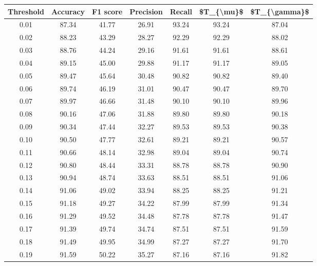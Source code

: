 \begin{tabular}{|c|c|c|c|c|c|c|}
\hline
 Threshold &  Accuracy &  F1 score &  Precision &  Recall &  \$T\_\{\textbackslash mu\}\$ &  \$T\_\{\textbackslash gamma\}\$ \\
\hline
      0.01 &     87.34 &     41.77 &      26.91 &   93.24 &      93.24 &         87.04 \\
      0.02 &     88.23 &     43.29 &      28.27 &   92.29 &      92.29 &         88.02 \\
      0.03 &     88.76 &     44.24 &      29.16 &   91.61 &      91.61 &         88.61 \\
      0.04 &     89.15 &     45.00 &      29.88 &   91.17 &      91.17 &         89.05 \\
      0.05 &     89.47 &     45.64 &      30.48 &   90.82 &      90.82 &         89.40 \\
      0.06 &     89.74 &     46.19 &      31.01 &   90.47 &      90.47 &         89.70 \\
      0.07 &     89.97 &     46.66 &      31.48 &   90.10 &      90.10 &         89.96 \\
      0.08 &     90.16 &     47.06 &      31.88 &   89.80 &      89.80 &         90.18 \\
      0.09 &     90.34 &     47.44 &      32.27 &   89.53 &      89.53 &         90.38 \\
      0.10 &     90.50 &     47.77 &      32.61 &   89.21 &      89.21 &         90.57 \\
      0.11 &     90.66 &     48.14 &      32.98 &   89.04 &      89.04 &         90.74 \\
      0.12 &     90.80 &     48.44 &      33.31 &   88.78 &      88.78 &         90.90 \\
      0.13 &     90.94 &     48.74 &      33.63 &   88.51 &      88.51 &         91.06 \\
      0.14 &     91.06 &     49.02 &      33.94 &   88.25 &      88.25 &         91.21 \\
      0.15 &     91.18 &     49.27 &      34.22 &   87.99 &      87.99 &         91.34 \\
      0.16 &     91.29 &     49.52 &      34.48 &   87.78 &      87.78 &         91.47 \\
      0.17 &     91.39 &     49.74 &      34.74 &   87.51 &      87.51 &         91.59 \\
      0.18 &     91.49 &     49.95 &      34.99 &   87.27 &      87.27 &         91.70 \\
      0.19 &     91.59 &     50.22 &      35.27 &   87.16 &      87.16 &         91.82 \\

\end{tabular}
